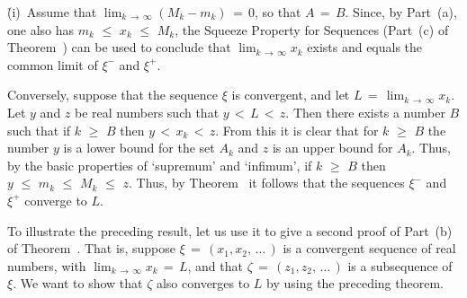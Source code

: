 {    \h (i)\, Assume that $\lim_{k \,{\rightarrow}\, {\infty}} (M_{k}-m_{k}) \,=\, 0$, so that $A \,=\, B$. Since, by Part~(a), one also has $m_{k}\,\,{\leq}\,\,x_{k}\,\,{\leq}\,\,M_{k}$, 
    the Squeeze Property for Sequences (Part~(c) of Theorem~) can be used to conclude that $\lim_{k \,{\rightarrow}\, {\infty}} x_{k}$ exists and equals the common limit of ${\xi}^{-}$ and ${\xi}^{+}$.

        Conversely, suppose that the sequence ${\xi}$ is convergent, and let $L \,=\, \lim_{k \,{\rightarrow}\, {\infty}} x_{k}$.
    Let $y$ and $z$ be real numbers such that $y\,<\,L\,<\,z$.
    Then there exists a number $B$ such that if $k\,\,{\geq}\,\,B$ then $y\,<\,x_{k}\,<\,z$.
    From this it is clear that for $k\,\,{\geq}\,\,B$ the number $y$ is a lower bound for the set $A_{k}$ and $z$ is an upper bound for $A_{k}$.
    Thus, by the basic properties of `supremum' and `infimum', if $k\,\,{\geq}\,\,B$ then 
    $y\,\,{\leq}\,\,m_{k}\,\,{\leq}\,\,M_{k}\,\,{\leq}\,\,z$.
    Thus, by Theorem~ it follows that the sequences ${\xi}^{-}$ and ${\xi}^{+}$ converge to $L$.

\V
\V

        To illustrate the preceding result, let us use it to give a second proof of Part~(b) of Theorem~.
    That is, suppose ${\xi} \,=\, (x_{1},x_{2},\,{\ldots}\,)$ is a convergent sequence of real numbers, with $\lim_{k \,{\rightarrow}\, {\infty}} x_{k} \,=\, L$,
    and that ${\zeta} \,=\, (z_{1},z_{2},\,{\ldots}\,)$ is a subsequence of ${\xi}$.
     We want to show that ${\zeta}$ also converges to $L$ by using the preceding theorem.

\V

}
